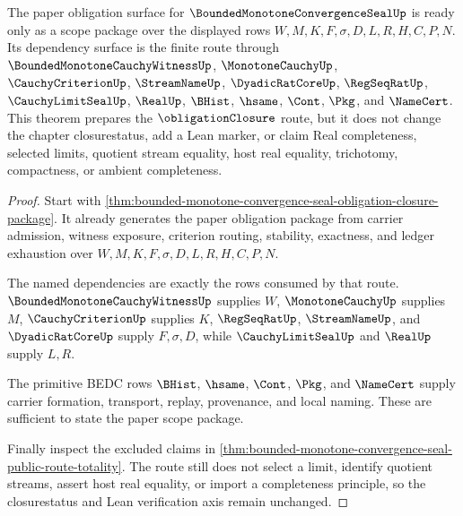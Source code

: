 \begin{theorem}
\label{thm:bounded-monotone-convergence-seal-obligation-upgrade-scope}
The paper obligation surface for $\BoundedMonotoneConvergenceSealUp$ is ready only as a scope package over the displayed rows $W,M,K,F,\sigma,D,L,R,H,C,P,N$. Its dependency surface is the finite route through $\BoundedMonotoneCauchyWitnessUp$, $\MonotoneCauchyUp$, $\CauchyCriterionUp$, $\StreamNameUp$, $\DyadicRatCoreUp$, $\RegSeqRatUp$, $\CauchyLimitSealUp$, $\RealUp$, $\BHist$, $\hsame$, $\Cont$, $\Pkg$, and $\NameCert$. This theorem prepares the $\obligationClosure$ route, but it does not change the chapter closurestatus, add a Lean marker, or claim Real completeness, selected limits, quotient stream equality, host real equality, trichotomy, compactness, or ambient completeness.
\end{theorem}
\begin{proof}
Start with \autoref{thm:bounded-monotone-convergence-seal-obligation-closure-package}. It already generates the paper obligation package from carrier admission, witness exposure, criterion routing, stability, exactness, and ledger exhaustion over $W,M,K,F,\sigma,D,L,R,H,C,P,N$.

The named dependencies are exactly the rows consumed by that route. $\BoundedMonotoneCauchyWitnessUp$ supplies $W$, $\MonotoneCauchyUp$ supplies $M$, $\CauchyCriterionUp$ supplies $K$, $\RegSeqRatUp$, $\StreamNameUp$, and $\DyadicRatCoreUp$ supply $F,\sigma,D$, while $\CauchyLimitSealUp$ and $\RealUp$ supply $L,R$.

The primitive BEDC rows $\BHist$, $\hsame$, $\Cont$, $\Pkg$, and $\NameCert$ supply carrier formation, transport, replay, provenance, and local naming. These are sufficient to state the paper scope package.

Finally inspect the excluded claims in \autoref{thm:bounded-monotone-convergence-seal-public-route-totality}. The route still does not select a limit, identify quotient streams, assert host real equality, or import a completeness principle, so the closurestatus and Lean verification axis remain unchanged.
\end{proof}


